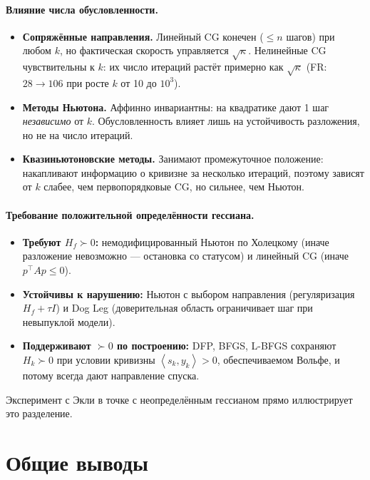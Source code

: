 \documentclass[a4paper,12pt]{article}
\newcommand{\inner}[2]{\left\langle #1, #2 \right\rangle}
\theoremstyle{definition}
\begin{document}
\paragraph{Влияние числа обусловленности.}
\begin{itemize}
    \item \textbf{Сопряжённые направления.} Линейный CG конечен ($\leq n$ шагов) при любом $k$,
          но фактическая скорость управляется $\sqrt{\kappa}$. Нелинейные CG чувствительны к $k$:
          их число итераций растёт примерно как $\sqrt{\kappa}$ (FR: $28 \to 106$ при росте $k$ от
          10 до $10^3$).
    \item \textbf{Методы Ньютона.} Аффинно инвариантны: на квадратике дают 1 шаг \emph{независимо}
          от $k$. Обусловленность влияет лишь на устойчивость разложения, но не на число итераций.
    \item \textbf{Квазиньютоновские методы.} Занимают промежуточное положение: накапливают
          информацию о кривизне за несколько итераций, поэтому зависят от $k$ слабее, чем
          первопорядковые CG, но сильнее, чем Ньютон.
\end{itemize}

\paragraph{Требование положительной определённости гессиана.}
\begin{itemize}
    \item \textbf{Требуют $H_f \succ 0$:} немодифицированный Ньютон по Холецкому (иначе разложение
          невозможно — остановка со статусом) и линейный CG (иначе $p^\top A p \leq 0$).
    \item \textbf{Устойчивы к нарушению:} Ньютон с выбором направления (регуляризация
          $H_f + \tau I$) и Dog Leg (доверительная область ограничивает шаг при невыпуклой модели).
    \item \textbf{Поддерживают $\succ 0$ по построению:} DFP, BFGS, L-BFGS сохраняют
          $H_k \succ 0$ при условии кривизны $\inner{s_k}{y_k} > 0$, обеспечиваемом Вольфе, и потому
          всегда дают направление спуска.
\end{itemize}
Эксперимент с Экли в точке с неопределённым гессианом прямо иллюстрирует это разделение.

\section{Общие выводы}
\end{document}
